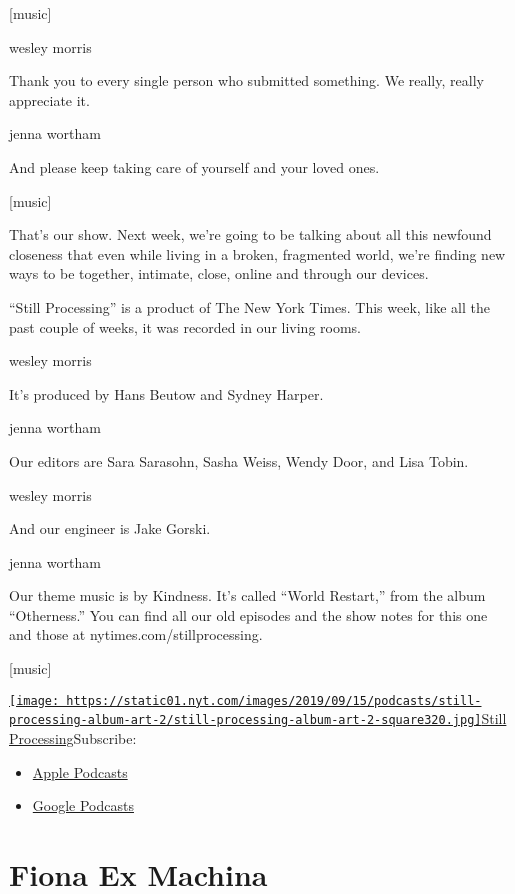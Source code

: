 {[}music{]}

wesley morris

Thank you to every single person who submitted something. We really,
really appreciate it.

jenna wortham

And please keep taking care of yourself and your loved ones.

{[}music{]}

That's our show. Next week, we're going to be talking about all this
newfound closeness that even while living in a broken, fragmented world,
we're finding new ways to be together, intimate, close, online and
through our devices.

``Still Processing'' is a product of The New York Times. This week, like
all the past couple of weeks, it was recorded in our living rooms.

wesley morris

It's produced by Hans Beutow and Sydney Harper.

jenna wortham

Our editors are Sara Sarasohn, Sasha Weiss, Wendy Door, and Lisa Tobin.

wesley morris

And our engineer is Jake Gorski.

jenna wortham

Our theme music is by Kindness. It's called ``World Restart,'' from the
album ``Otherness.'' You can find all our old episodes and the show
notes for this one and those at nytimes.com/stillprocessing.

{[}music{]}

\href{https://www.nytimes.com/column/still-processing-podcast}{\texttt{[image: https://static01.nyt.com/images/2019/09/15/podcasts/still-processing-album-art-2/still-processing-album-art-2-square320.jpg]}Still
Processing}Subscribe:

\begin{itemize}
\tightlist
\item
  \href{https://itunes.apple.com/us/podcast/id1151436460}{Apple
  Podcasts}
\item
  \href{https://www.google.com/podcasts?feed=aHR0cHM6Ly9yc3MuYXJ0MTkuY29tL255dC1zdGlsbC1wcm9jZXNzaW5n}{Google
  Podcasts}
\end{itemize}

\hypertarget{fiona-ex-machina-1}{%
\section{Fiona Ex Machina}\label{fiona-ex-machina-1}}

